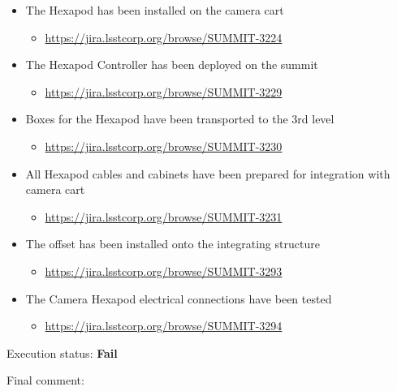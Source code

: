 \documentclass[SE,lsstdraft,STR,toc]{lsstdoc}
\providecommand{\tightlist}{
  \setlength{\itemsep}{0pt}\setlength{\parskip}{0pt}}
\begin{document}
\begin{itemize}
\tightlist
\item
  The Hexapod has been installed on the camera cart

  \begin{itemize}
  \tightlist
  \item
    \url{https://jira.lsstcorp.org/browse/SUMMIT-3224}
  \end{itemize}
\item
  The Hexapod Controller has been deployed on the summit

  \begin{itemize}
  \tightlist
  \item
    \url{https://jira.lsstcorp.org/browse/SUMMIT-3229}
  \end{itemize}
\item
  Boxes for the Hexapod have been transported to the 3rd level

  \begin{itemize}
  \tightlist
  \item
    \url{https://jira.lsstcorp.org/browse/SUMMIT-3230}
  \end{itemize}
\item
  All Hexapod cables and cabinets have been prepared for integration
  with camera cart

  \begin{itemize}
  \tightlist
  \item
    \url{https://jira.lsstcorp.org/browse/SUMMIT-3231}
  \end{itemize}
\item
  The offset has been installed onto the integrating structure

  \begin{itemize}
  \tightlist
  \item
    \url{https://jira.lsstcorp.org/browse/SUMMIT-3293}
  \end{itemize}
\item
  The Camera Hexapod electrical connections have been tested

  \begin{itemize}
  \tightlist
  \item
    \url{https://jira.lsstcorp.org/browse/SUMMIT-3294}
  \end{itemize}
\end{itemize}


Execution status: {\bf Fail }

Final comment:\\
\end{document}
